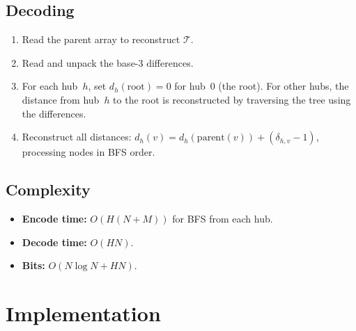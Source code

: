 \documentclass[11pt,a4paper]{article}
\begin{document}
\subsection{Decoding}
\begin{enumerate}
    \item Read the parent array to reconstruct $\mathcal{T}$.
    \item Read and unpack the base-3 differences.
    \item For each hub~$h$, set $d_h(\text{root}) = 0$ for hub~$0$ (the root). For other hubs, the distance from hub~$h$ to the root is reconstructed by traversing the tree using the differences.
    \item Reconstruct all distances: $d_h(v) = d_h(\mathrm{parent}(v)) + (\delta_{h,v} - 1)$, processing nodes in BFS order.
\end{enumerate}

\subsection{Complexity}
\begin{itemize}
    \item \textbf{Encode time:} $O(H(N + M))$ for BFS from each hub.
    \item \textbf{Decode time:} $O(HN)$.
    \item \textbf{Bits:} $O(N \log N + HN)$.
\end{itemize}

\section{Implementation}
\end{document}
